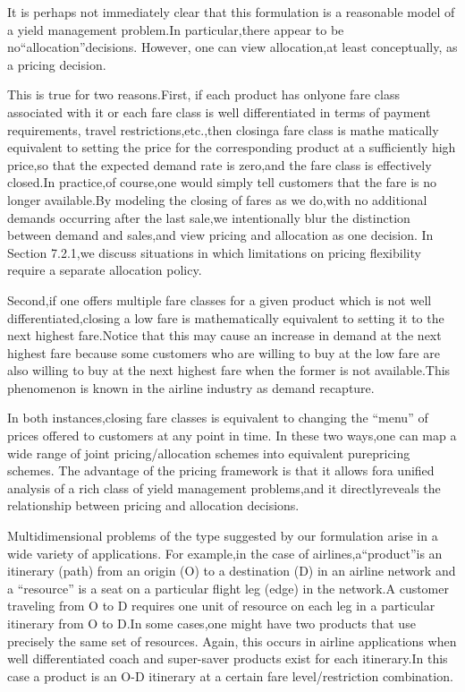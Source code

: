 It is perhaps not immediately clear that this formulation is a
reasonable model of a yield management problem.In particular,there
appear to be no``allocation''decisions. However, one can view
allocation,at least conceptually, as a pricing decision.

This is true for two reasons.First, if each product has onlyone fare
class associated with it or each fare class is well differentiated in
terms of payment requirements, travel restrictions,etc.,then closinga
fare class is mathe matically equivalent to setting the price for the
corresponding product at a sufficiently high price,so that the expected
demand rate is zero,and the fare class is effectively closed.In
practice,of course,one would simply tell customers that the fare is no
longer available.By modeling the closing of fares as we do,with no
additional demands occurring after the last sale,we intentionally blur
the distinction between demand and sales,and view pricing and allocation
as one decision. In Section 7.2.1,we discuss situations in which
limitations on pricing flexibility require a separate allocation policy.

Second,if one offers multiple fare classes for a given product which is
not well differentiated,closing a low fare is mathematically equivalent
to setting it to the next highest fare.Notice that this may cause an
increase in demand at the next highest fare because some customers who
are willing to buy at the low fare are also willing to buy at the next
highest fare when the former is not available.This phenomenon is known
in the airline industry as demand recapture.

In both instances,closing fare classes is equivalent to changing the
``menu'' of prices offered to customers at any point in time. In these
two ways,one can map a wide range of joint pricing/allocation schemes
into equivalent purepricing schemes. The advantage of the pricing
framework is that it allows fora unified analysis of a rich class of
yield management problems,and it directlyreveals the relationship
between pricing and allocation decisions.

Multidimensional problems of the type suggested by our formulation arise
in a wide variety of applications. For example,in the case of
airlines,a``product''is an itinerary (path) from an origin (O) to a
destination (D) in an airline network and a ``resource'' is a seat on a
particular flight leg (edge) in the network.A customer traveling from O
to D requires one unit of resource on each leg in a particular itinerary
from O to D.In some cases,one might have two products that use precisely
the same set of resources. Again, this occurs in airline applications
when well differentiated coach and super-saver products exist for each
itinerary.In this case a product is an O-D itinerary at a certain fare
level/restriction combination.

